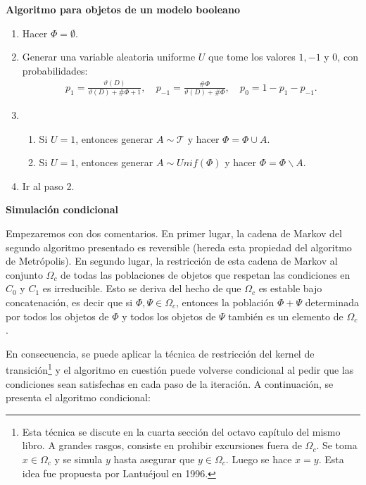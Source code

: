 \textbf{Algoritmo para objetos de un modelo booleano}

\begin{enumerate}
\item Hacer $\Phi=\emptyset$.
\item Generar una variable aleatoria uniforme $U$ que tome los valores $1,-1$ y $0$, con probabilidades:
    \[\begin{array}{lcr}p_{1}=\frac{\vartheta(D)}{\vartheta(D)+\#\Phi+1},&\ p_{-1}=\frac{\#\Phi}{\vartheta(D)+\#\Phi},&\ p_0=1-p_1-p_{-1}.\end{array}\]
\item \begin{enumerate}
\item Si $U=1$, entonces generar $A\sim\mathcal{T}$ y hacer $\Phi=\Phi\cup A$.
\item Si $U=1$, entonces generar $A\sim Unif(\Phi)$ y hacer $\Phi=\Phi\backslash A$.
\end{enumerate}
\item Ir al paso 2.
\end{enumerate}

\vspace{0.1in}

\textbf{Simulaci\'on condicional}

Empezaremos con dos comentarios. En primer lugar, la cadena de Markov del segundo algoritmo presentado es reversible (hereda esta propiedad del algoritmo de Metr\'opolis). En segundo lugar, la restricci\'on de esta cadena de Markov al conjunto $\Omega_c$ de todas las poblaciones de objetos que respetan las condiciones en $C_0$ y $C_1$ es irreducible. Esto se deriva del hecho de que $\Omega_c$ es estable bajo concatenaci\'on, es decir que si $\Phi,\Psi\in\Omega_c$, entonces la poblaci\'on $\Phi+\Psi$ determinada por todos los objetos de $\Phi$ y todos los objetos de $\Psi$ tambi\'en es un elemento de $\Omega_c$.

En consecuencia, se puede aplicar la t\'ecnica de restricci\'on del kernel de transici\'on\footnote{Esta t\'ecnica se discute en la cuarta secci\'on del octavo cap\'itulo del mismo libro. A grandes rasgos, consiste en prohibir excursiones fuera de $\Omega_c$. Se toma $x\in\Omega_c$ y se simula $y$ hasta asegurar que $y\in\Omega_c$. Luego se hace $x=y$. Esta idea fue propuesta por Lantu\'ejoul en 1996.} y el algoritmo en cuesti\'on puede volverse condicional al pedir que las condiciones sean satisfechas en cada paso de la iteraci\'on. A continuaci\'on, se presenta el algoritmo condicional:

